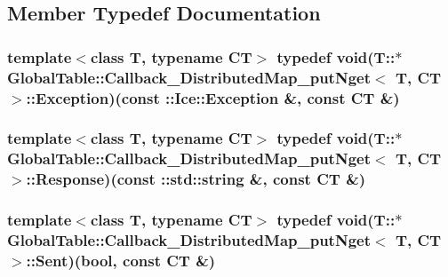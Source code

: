 \subsection{Member Typedef Documentation}
\hypertarget{class_global_table_1_1_callback___distributed_map__put_nget_a48bbaf406f2d2808978aae28a5d97fec}{
\subsubsection[{Exception}]{\setlength{\rightskip}{0pt plus 5cm}template$<$class T, typename CT$>$ typedef void(T::$\ast$ {\bf GlobalTable::Callback\_\-DistributedMap\_\-putNget}$<$ T, CT $>$::{\bf Exception})(const ::Ice::Exception \&, const CT \&)}}
\label{class_global_table_1_1_callback___distributed_map__put_nget_a48bbaf406f2d2808978aae28a5d97fec}
\hypertarget{class_global_table_1_1_callback___distributed_map__put_nget_a2cc52cb4955940f3e037371ca7cb6b08}{
\subsubsection[{Response}]{\setlength{\rightskip}{0pt plus 5cm}template$<$class T, typename CT$>$ typedef void(T::$\ast$ {\bf GlobalTable::Callback\_\-DistributedMap\_\-putNget}$<$ T, CT $>$::{\bf Response})(const ::std::string \&, const CT \&)}}
\label{class_global_table_1_1_callback___distributed_map__put_nget_a2cc52cb4955940f3e037371ca7cb6b08}
\hypertarget{class_global_table_1_1_callback___distributed_map__put_nget_a66e1df0479df703206b863c898f0d9dd}{
\subsubsection[{Sent}]{\setlength{\rightskip}{0pt plus 5cm}template$<$class T, typename CT$>$ typedef void(T::$\ast$ {\bf GlobalTable::Callback\_\-DistributedMap\_\-putNget}$<$ T, CT $>$::{\bf Sent})(bool, const CT \&)}}

